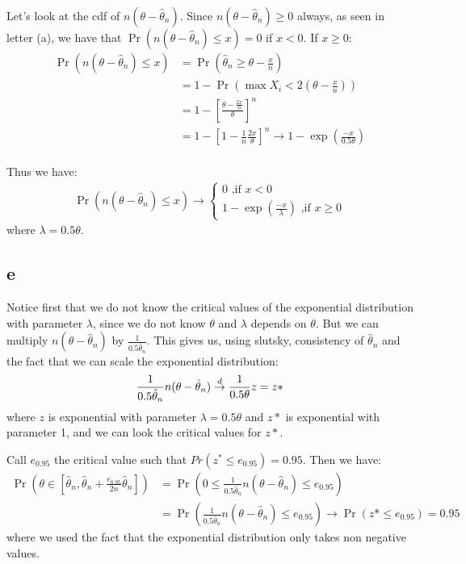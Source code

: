 \documentclass[12pt]{paper}
\begin{document}
Let's look at the cdf of $n(\theta-\hat{\theta}_n)$. Since $n(\theta-\hat{\theta}_n)\ge0$ always, as seen in letter (a), we have that $\Pr(n(\theta-\hat{\theta}_n)\le x)=0$ if $x<0$. If $x\ge0$:
\begin{align*}
\Pr(n(\theta-\hat{\theta}_n)\le x)&=\Pr(\hat{\theta}_n\ge \theta-\frac{x}{n})\\
&=1-\Pr(\max{X_i}<2(\theta-\frac{x}{n}))\\
&=1-[\frac{\theta-\frac{2x}{n}}{\theta}]^n\\
&=1-[1-\frac{1}{n}\frac{2x}{\theta}]^n\to1-\exp(\frac{-x}{0.5\theta})\\
\end{align*}

Thus we have:
\begin{align*}
\Pr(n(\theta-\hat{\theta}_n)\le x)\to\begin{cases}
0 \text{ ,if $x<0$}\\
1-\exp(\frac{-x}{\lambda}) \text{ ,if $x\ge0$}
\end{cases}
\end{align*}
\noindent where $\lambda=0.5\theta$.

\subsection*{e}

Notice first that we do not know the critical values of the exponential distribution with parameter $\lambda$, since we do not know $\theta$ and $\lambda$ depends on $\theta$. But we can multiply $n(\theta-\hat{\theta}_n)$ by $\frac{1}{0.5\hat{\theta}_n}$. This gives us, using slutsky, consistency of $\hat{\theta}_n$ and the fact that we can scale the exponential distribution:
\begin{align*}
\frac{1}{0.5\hat{\theta}_n}n(\theta-\hat{\theta}_n)\overset{d}{\to}\frac{1}{0.5\theta}z=z*
\end{align*}
\noindent where $z$ is  exponential with parameter $\lambda= 0.5\theta$ and $z*$ is exponential with parameter 1, and we can look the critical values for $z*$.

Call $e_{0.95}$ the critical value such that $Pr(z^*\le e_{0.95})=0.95$. Then we have:
\begin{align*}
\Pr\left(\theta\in[\hat{\theta}_n,\hat{\theta}_n+\frac{e_{0.95}}{2n}\hat{\theta}_n]\right)&=
\Pr(0\le \frac{1}{0.5\hat{\theta}_n}n(\theta-\hat{\theta}_n)\le e_{0.95})\\
&=\Pr(\frac{1}{0.5\hat{\theta}_n}n(\theta-\hat{\theta}_n)\le e_{0.95})\to\Pr(z*\le e_{0.95})=0.95
\end{align*}
\noindent where we used the fact that the exponential distribution only takes non negative values.
\end{document}
